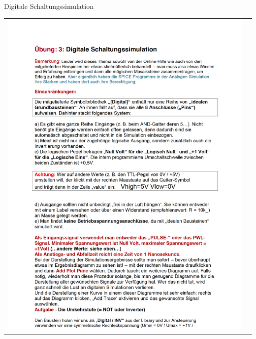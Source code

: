 \begin{frame}[t]{Digitale Schaltungssimulation}

    \begin{spacing}{0.9} \begin{tiny}
            \begin{table}[h!]
                \begin{tabular}{p{5cm} p{5cm}}
                    \begin{minipage}{0.5\textwidth}
                        \includegraphics[width=\linewidth]{pictures/legacy/digi_1.png}
                    \end{minipage}
                     &
                    \begin{minipage}{0.5\textwidth}

\end{minipage}
\end{tabular}
\end{table}
\end{tiny}
\end{spacing}
\end{frame}
